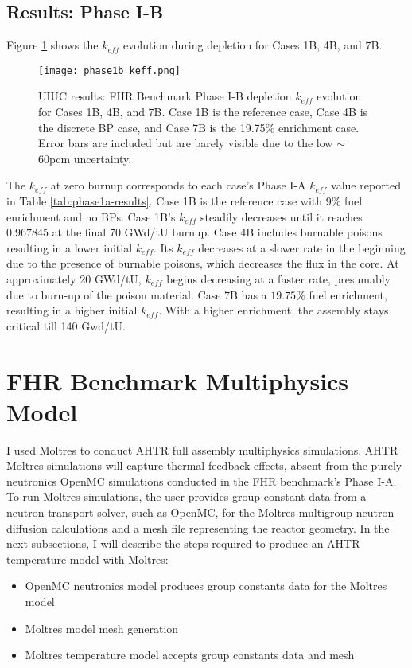 \subsection{Results: Phase I-B}
Figure \ref{fig:phase1b_keff} shows the $k_{eff}$ evolution during depletion 
for Cases 1B, 4B, and 7B.
\begin{figure}[htbp]
    \centering
    \texttt{[image: phase1b\_keff.png]} 
    \caption{\acrlong{UIUC} results: \acrlong{FHR} Benchmark Phase I-B depletion 
    $k_{eff}$ evolution for Cases 1B, 4B, and 7B. Case 1B is the reference case, 
    Case 4B is the discrete \acrlong{BP} case, and Case 7B is the 19.75$\%$ 
    enrichment case. Error bars are included but are barely visible due to the 
    low $\sim$60pcm uncertainty.}
    \label{fig:phase1b_keff}
\end{figure}
The $k_{eff}$ at zero burnup corresponds to each case's Phase I-A $k_{eff}$ value 
reported in Table \ref{tab:phase1a-results}. 
Case 1B is the reference case with $9\%$ fuel enrichment and no \glspl{BP}. 
Case 1B's $k_{eff}$ steadily decreases until it reaches 0.967845 at the final 70 
GWd/tU burnup. 
Case 4B includes burnable poisons resulting in a lower initial $k_{eff}$. 
Its $k_{eff}$ decreases at a slower rate in the beginning due to the presence of 
burnable poisons, which decreases the flux in the core. 
At approximately 20 GWd/tU, $k_{eff}$ begins decreasing at a faster rate, presumably
due to burn-up of the poison material.   
Case 7B has a $19.75\%$ fuel enrichment, resulting in a higher initial $k_{eff}$. 
With a higher enrichment, the assembly stays critical till 140 Gwd/tU. 

\section{FHR Benchmark Multiphysics Model}
I used Moltres \cite{lindsay_moltres_2017} to conduct \gls{AHTR} full assembly multiphysics 
simulations. 
AHTR Moltres simulations will capture thermal feedback effects, absent from the purely 
neutronics OpenMC simulations conducted in the \gls{FHR} benchmark's Phase I-A.
To run Moltres simulations, the user provides group constant data from a neutron transport 
solver, such as OpenMC, for the Moltres multigroup neutron diffusion calculations and
a mesh file representing the reactor geometry. 
In the next subsections, I will describe the steps required to produce an 
\gls{AHTR} temperature model with Moltres:
\begin{itemize}
    \item OpenMC neutronics model produces group constants data for the Moltres model
    \item Moltres model mesh generation
    \item Moltres temperature model accepts group constants data and mesh
\end{itemize}

